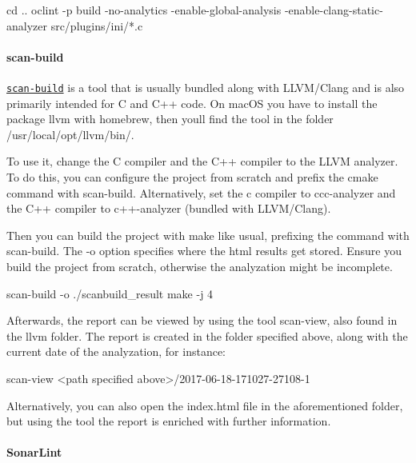 \begin{DoxyCode}
cd ..
oclint -p build -no-analytics -enable-global-analysis -enable-clang-static-analyzer src/plugins/ini/*.c
\end{DoxyCode}


\paragraph*{scan-\/build}

\href{http://clang-analyzer.llvm.org/scan-build.html}{\tt scan-\/build} is a tool that is usually bundled along with L\+L\+V\+M/\+Clang and is also primarily intended for C and C++ code. On mac\+OS you have to install the package {\ttfamily llvm} with homebrew, then you\textquotesingle{}ll find the tool in the folder {\ttfamily /usr/local/opt/llvm/bin/}.

To use it, change the C compiler and the C++ compiler to the L\+L\+VM analyzer. To do this, you can configure the project from scratch and prefix the cmake command with {\ttfamily scan-\/build}. Alternatively, set the c compiler to {\ttfamily ccc-\/analyzer} and the C++ compiler to {\ttfamily c++-\/analyzer} (bundled with L\+L\+V\+M/\+Clang).

Then you can build the project with {\ttfamily make} like usual, prefixing the command with {\ttfamily scan-\/build}. The {\ttfamily -\/o} option specifies where the html results get stored. Ensure you build the project from scratch, otherwise the analyzation might be incomplete.


\begin{DoxyCode}
scan-build -o ./scanbuild\_result make -j 4
\end{DoxyCode}


Afterwards, the report can be viewed by using the tool {\ttfamily scan-\/view}, also found in the llvm folder. The report is created in the folder specified above, along with the current date of the analyzation, for instance\+:


\begin{DoxyCode}
scan-view <path specified above>/2017-06-18-171027-27108-1
\end{DoxyCode}


Alternatively, you can also open the {\ttfamily index.\+html} file in the aforementioned folder, but using the tool the report is enriched with further information.

\paragraph*{Sonar\+Lint}

